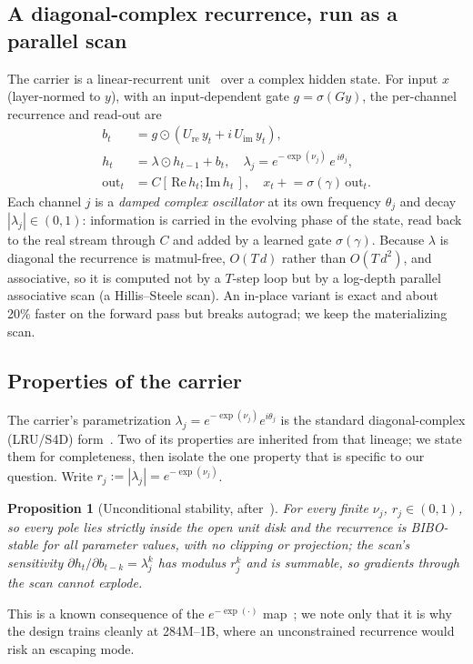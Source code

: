 \documentclass[10pt,twocolumn]{article}
\newtheorem{proposition}{Proposition}
\begin{document}
\subsection{A diagonal-complex recurrence, run as a parallel scan}
The carrier is a linear-recurrent unit~\cite{gu2022s4} over a complex hidden state. For input $x$ (layer-normed to $y$), with an input-dependent gate $g=\sigma(G y)$, the per-channel recurrence and read-out are
\begin{align}
b_t &= g \odot (U_{\mathrm{re}}\, y_t + i \, U_{\mathrm{im}}\, y_t), \\
h_t &= \lambda \odot h_{t-1} + b_t, \quad \lambda_j = e^{-\exp(\nu_j)}\, e^{\,i\theta_j}, \\
\mathrm{out}_t &= C[\,\mathrm{Re}\, h_t ; \mathrm{Im}\, h_t\,], \quad x_t \mathrel{+}= \sigma(\gamma)\, \mathrm{out}_t. \nonumber
\end{align}
Each channel $j$ is a \emph{damped complex oscillator} at its own frequency $\theta_j$ and decay $|\lambda_j|\in(0,1)$: information is carried in the evolving phase of the state, read back to the real stream through $C$ and added by a learned gate $\sigma(\gamma)$. Because $\lambda$ is diagonal the recurrence is matmul-free, $O(T\,d)$ rather than $O(T\,d^2)$, and associative, so it is computed not by a $T$-step loop but by a log-depth parallel associative scan (a Hillis--Steele scan). An in-place variant is exact and about 20\% faster on the forward pass but breaks autograd; we keep the materializing scan.

\subsection{Properties of the carrier}
\label{sec:properties}
The carrier's parametrization $\lambda_j = e^{-\exp(\nu_j)}e^{i\theta_j}$ is the standard diagonal-complex (LRU/S4D) form~\cite{orvieto2023lru,gu2022s4d}. Two of its properties are inherited from that lineage; we state them for completeness, then isolate the one property that is specific to our question. Write $r_j := |\lambda_j| = e^{-\exp(\nu_j)}$.

\begin{proposition}[Unconditional stability, after~\cite{orvieto2023lru,gu2022s4d}]
For every finite $\nu_j$, $r_j\in(0,1)$, so every pole lies strictly inside the open unit disk and the recurrence is BIBO-stable for all parameter values, with no clipping or projection; the scan's sensitivity $\partial h_t/\partial b_{t-k}=\lambda_j^k$ has modulus $r_j^k$ and is summable, so gradients through the scan cannot explode.
\end{proposition}
\noindent This is a known consequence of the $e^{-\exp(\cdot)}$ map~\cite{orvieto2023lru}; we note only that it is why the design trains cleanly at 284M--1B, where an unconstrained recurrence would risk an escaping mode.
\end{document}
